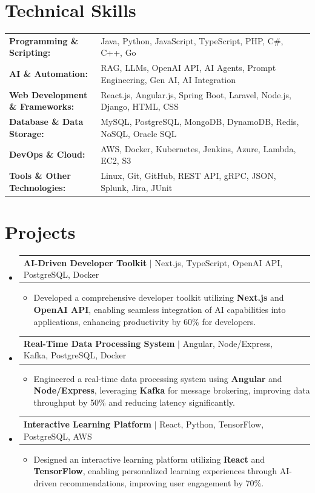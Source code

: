 \documentclass[letterpaper,10pt]{article}
\makeatletter
\newcommand{\resumeItem}[1]{
  \item{\fontsize{8pt}{9pt}\selectfont
    #1 \vspace{-3pt}
  }
}
\newcommand{\resumeProjectHeading}[2]{
    \item
    \begin{tabular*}{1.001\textwidth}{l@{\extracolsep{\fill}}r}
      \fontsize{8.5pt}{10pt}#1 & \textbf{\fontsize{8.5pt}{10pt} #2}\\
    \end{tabular*}\vspace{-7pt}
}
\newcommand{\resumeSubHeadingListStart}{\begin{itemize}[leftmargin=0pt, label={}]}
\newcommand{\resumeSubHeadingListEnd}{\end{itemize}}
\newcommand{\resumeItemListStart}{\begin{itemize}[leftmargin=*]}
\newcommand{\resumeItemListEnd}{\end{itemize}\vspace{-5pt}}
\makeatother
\begin{document}
\section{Technical Skills}
        \vspace{-14pt}
        \begin{table}[h]
            \fontsize{8pt}{9pt}\selectfont
            \begin{tabular}{p{0.3\linewidth} p{0.7\linewidth}}
                \textbf{Programming \& Scripting:} & Java, Python, JavaScript, TypeScript, PHP, C\#, C++, Go \\
                \textbf{AI \& Automation:} & RAG, LLMs, OpenAI API, AI Agents, Prompt Engineering, Gen AI, AI Integration \\
                \textbf{Web Development \& Frameworks:} & React.js, Angular.js, Spring Boot, Laravel, Node.js, Django, HTML, CSS \\
                \textbf{Database \& Data Storage:} & MySQL, PostgreSQL, MongoDB, DynamoDB, Redis, NoSQL, Oracle SQL \\
                \textbf{DevOps \& Cloud:} & AWS, Docker, Kubernetes, Jenkins, Azure, Lambda, EC2, S3 \\
                \textbf{Tools \& Other Technologies:} & Linux, Git, GitHub, REST API, gRPC, JSON, Splunk, Jira, JUnit \\
            \end{tabular}
        \end{table}
 \vspace{-18pt}

\section{Projects}
    \vspace{-5pt}
    \resumeSubHeadingListStart
          \resumeProjectHeading
            {\textbf{AI-Driven Developer Toolkit} $|$ Next.js, TypeScript, OpenAI API, PostgreSQL, Docker}{}
            \resumeItemListStart
                \resumeItem{Developed a comprehensive developer toolkit utilizing \textbf{Next.js} and \textbf{OpenAI API}, enabling seamless integration of AI capabilities into applications, enhancing productivity by 60\% for developers.}
            \resumeItemListEnd
        \vspace{-12pt}
    
        \resumeProjectHeading
            {\textbf{Real-Time Data Processing System} $|$ Angular, Node/Express, Kafka, PostgreSQL, Docker}{}
        \resumeItemListStart
                \resumeItem{Engineered a real-time data processing system using \textbf{Angular} and \textbf{Node/Express}, leveraging \textbf{Kafka} for message brokering, improving data throughput by 50\% and reducing latency significantly.}
        \resumeItemListEnd
      \vspace{-12pt}
      \resumeProjectHeading
        {\textbf{Interactive Learning Platform} $|$ React, Python, TensorFlow, PostgreSQL, AWS}{}
    \resumeItemListStart
            \resumeItem{Designed an interactive learning platform utilizing \textbf{React} and \textbf{TensorFlow}, enabling personalized learning experiences through AI-driven recommendations, improving user engagement by 70\%.}
    \resumeItemListEnd
    \resumeSubHeadingListEnd
\end{document}
